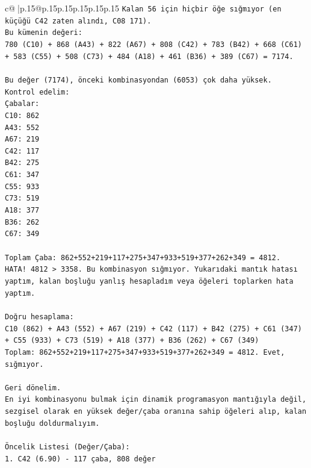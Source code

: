 \documentclass{article}
\begin{document}
{\begin{supertabular}{c@{$\;$}|p{.15\linewidth}@{}p{.15\linewidth}p{.15\linewidth}p{.15\linewidth}p{.15\linewidth}p{.15\linewidth}}
{{{\texttt{Kalan 56 için hiçbir öğe sığmıyor (en küçüğü C42 zaten alındı, C08 171).} \\
\texttt{Bu kümenin değeri:} \\
\texttt{780 (C10) + 868 (A43) + 822 (A67) + 808 (C42) + 783 (B42) + 668 (C61) + 583 (C55) + 508 (C73) + 484 (A18) + 461 (B36) + 389 (C67) = 7174.} \\
\\ 
\texttt{Bu değer (7174), önceki kombinasyondan (6053) çok daha yüksek.} \\
\texttt{Kontrol edelim:} \\
\texttt{Çabalar:} \\
\texttt{C10: 862} \\
\texttt{A43: 552} \\
\texttt{A67: 219} \\
\texttt{C42: 117} \\
\texttt{B42: 275} \\
\texttt{C61: 347} \\
\texttt{C55: 933} \\
\texttt{C73: 519} \\
\texttt{A18: 377} \\
\texttt{B36: 262} \\
\texttt{C67: 349} \\
\\ 
\texttt{Toplam Çaba: 862+552+219+117+275+347+933+519+377+262+349 = 4812.} \\
\texttt{HATA! 4812 > 3358. Bu kombinasyon sığmıyor. Yukarıdaki mantık hatası yaptım, kalan boşluğu yanlış hesapladım veya öğeleri toplarken hata yaptım.} \\
\\ 
\texttt{Doğru hesaplama:} \\
\texttt{C10 (862) + A43 (552) + A67 (219) + C42 (117) + B42 (275) + C61 (347) + C55 (933) + C73 (519) + A18 (377) + B36 (262) + C67 (349)} \\
\texttt{Toplam: 862+552+219+117+275+347+933+519+377+262+349 = 4812. Evet, sığmıyor.} \\
\\ 
\texttt{Geri dönelim.} \\
\texttt{En iyi kombinasyonu bulmak için dinamik programasyon mantığıyla değil, sezgisel olarak en yüksek değer/çaba oranına sahip öğeleri alıp, kalan boşluğu doldurmalıyım.} \\
\\ 
\texttt{Öncelik Listesi (Değer/Çaba):} \\
\texttt{1. C42 (6.90) {-} 117 çaba, 808 değer} \\
}}}
\end{supertabular}}
\end{document}
